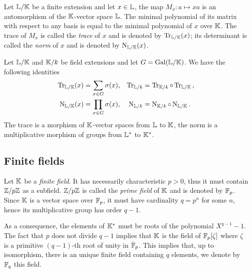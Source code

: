 Let $\mathbb{L}/\mathbb{K}$ be a finite extension and let $x\in\mathbb{L}$, the map
$M_x:a\mapsto xa$ is an automorphism of the $\mathbb{K}$-vector space
$\mathbb{L}$. The minimal polynomial of its matrix with respect to any basis
is equal to the minimal polynomial of $x$ over $\mathbb{K}$.  The trace of
$M_x$ is called the \textit{trace} of $x$
and is denoted by
$\operatorname{Tr}_{\mathbb{L}/\mathbb{K}}(x)$; its determinant is called the \textit{norm}
of $x$ and is denoted by
$\operatorname{N}_{\mathbb{L}/\mathbb{K}}(x)$.

\begin{proposition}
  \label{th:basic-galois-theory:trace}
  Let $\mathbb{L}/\mathbb{K}$ and $\mathbb{K}/k$ be field extensions and let
  $G=\operatorname{Gal}(\mathbb{L}/\mathbb{K})$. We have the following identities
  \begin{align*}
    \operatorname{Tr}_{\mathbb{L}/\mathbb{K}}(x) &= \sum_{\sigma\in G}\sigma(x) \text{,}&
    \operatorname{Tr}_{\mathbb{L}/k} &= \operatorname{Tr}_{\mathbb{K}/k}\circ\operatorname{Tr}_{\mathbb{L}/\mathbb{K}}\text{,}\\
    \operatorname{N}_{\mathbb{L}/\mathbb{K}}(x) &= \prod_{\sigma\in G}\sigma(x) \text{,}&
    \operatorname{N}_{\mathbb{L}/k} &= \operatorname{N}_{\mathbb{K}/k}\circ\operatorname{N}_{\mathbb{L}/\mathbb{K}}\text{.}
  \end{align*}
  The trace is a morphism of $\mathbb{K}$-vector spaces from $\mathbb{L}$ to $\mathbb{K}$,
  the norm is a multiplicative morphism of groups from $\mathbb{L}^\ast$ to
  $\mathbb{K}^\ast$.
\end{proposition}


\subsection{Finite fields}
\label{sec:basic-galois-theory:finite-fields}

Let $\mathbb{K}$ be a  \textit{finite field}. It has
necessarily characteristic $p>0$, thus it must contain $\mathbb{Z}/p\mathbb{Z}$ as a
subfield. $\mathbb{Z}/p\mathbb{Z}$ is called the \textit{prime
  field} of $\mathbb{K}$ and is denoted by $\mathbb{F}_p$. Since $\mathbb{K}$ is a vector
space over $\mathbb{F}_p$, it must have cardinality $q=p^n$ for some $n$,
hence its multiplicative group has order $q-1$.

As a consequence, the elements of $\mathbb{K}^\ast$ must be roots of the
polynomial $X^{q-1}-1$. The fact that $p$ does not divide $q-1$
implies that $\mathbb{K}$ is the field of $\mathbb{F}_p[\zeta]$ where $\zeta$ is a
primitive $(q-1)$-th root of unity in $\bar{\mathbb{F}}_p$. This implies that,
up to isomorphism, there is an unique finite field containing $q$
elements, we denote by $\mathbb{F}_q$ this field.


